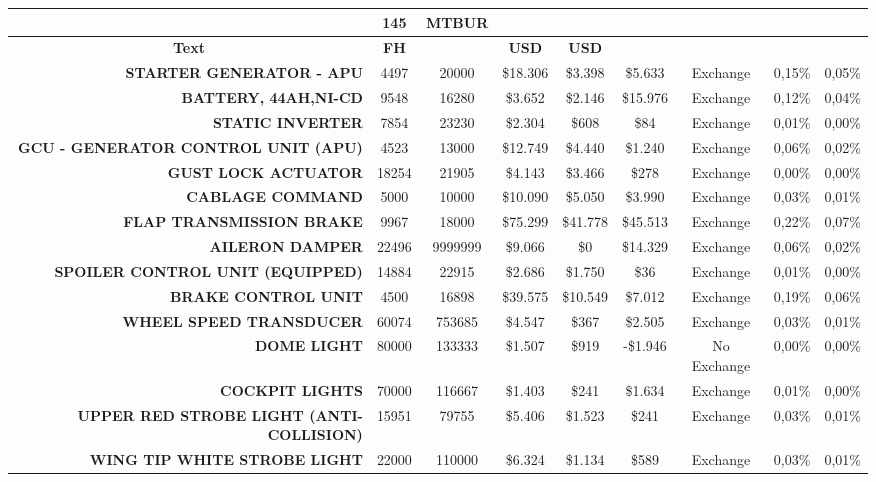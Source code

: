 \begin{table}[htbp]
\begin{tabular}{rcccccccc}
    \multicolumn{1}{c}{} & \textbf{145} & \textbf{MTBUR} &       &       &       &       &       &  \\
        \midrule
    \multicolumn{1}{c}{\textbf{Text}} & \textbf{FH} & \textbf{} & \textbf{USD} & \textbf{USD} & \textbf{} & \textbf{} & \textbf{} & \textbf{} \\
    \textbf{STARTER GENERATOR - APU} & 4497  & 20000 & \$18.306 & \$3.398 & \$5.633 & Exchange & 0,15\% & 0,05\% \\
    \textbf{BATTERY, 44AH,NI-CD} & 9548  & 16280 & \$3.652 & \$2.146 & \$15.976 & Exchange & 0,12\% & 0,04\% \\
    \textbf{STATIC INVERTER} & 7854  & 23230 & \$2.304 & \$608 & \$84  & Exchange & 0,01\% & 0,00\% \\
    \textbf{GCU - GENERATOR CONTROL UNIT (APU)} & 4523  & 13000 & \$12.749 & \$4.440 & \$1.240 & Exchange & 0,06\% & 0,02\% \\
    \textbf{GUST LOCK ACTUATOR} & 18254 & 21905 & \$4.143 & \$3.466 & \$278 & Exchange & 0,00\% & 0,00\% \\
    \textbf{CABLAGE COMMAND} & 5000  & 10000 & \$10.090 & \$5.050 & \$3.990 & Exchange & 0,03\% & 0,01\% \\
    \textbf{FLAP TRANSMISSION BRAKE} & 9967  & 18000 & \$75.299 & \$41.778 & \$45.513 & Exchange & 0,22\% & 0,07\% \\
    \textbf{AILERON DAMPER} & 22496 & 9999999 & \$9.066 & \$0   & \$14.329 & Exchange & 0,06\% & 0,02\% \\
    \textbf{SPOILER CONTROL UNIT (EQUIPPED)} & 14884 & 22915 & \$2.686 & \$1.750 & \$36  & Exchange & 0,01\% & 0,00\% \\
    \textbf{BRAKE CONTROL UNIT} & 4500  & 16898 & \$39.575 & \$10.549 & \$7.012 & Exchange & 0,19\% & 0,06\% \\
    \textbf{WHEEL SPEED TRANSDUCER } & 60074 & 753685 & \$4.547 & \$367 & \$2.505 & Exchange & 0,03\% & 0,01\% \\
    \textbf{DOME LIGHT} & 80000 & 133333 & \$1.507 & \$919 & -\$1.946 & No Exchange & 0,00\% & 0,00\% \\
    \textbf{COCKPIT LIGHTS} & 70000 & 116667 & \$1.403 & \$241 & \$1.634 & Exchange & 0,01\% & 0,00\% \\
    \textbf{UPPER RED STROBE LIGHT (ANTI-COLLISION)} & 15951 & 79755 & \$5.406 & \$1.523 & \$241 & Exchange & 0,03\% & 0,01\% \\
    \textbf{WING TIP WHITE STROBE LIGHT} & 22000 & 110000 & \$6.324 & \$1.134 & \$589 & Exchange & 0,03\% & 0,01\% \\

\end{tabular}
\end{table}

